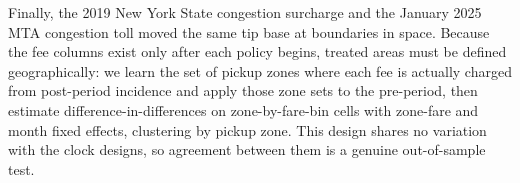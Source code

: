 Finally, the 2019 New York State congestion surcharge and the January
2025 MTA congestion toll moved the same tip base at boundaries in space.
Because the fee columns exist only after each policy begins, treated
areas must be defined geographically: we learn the set of pickup zones
where each fee is actually charged from post-period incidence and apply
those zone sets to the pre-period, then estimate
difference-in-differences on zone-by-fare-bin cells with zone-fare and
month fixed effects, clustering by pickup zone. This design shares no
variation with the clock designs, so agreement between them is a
genuine out-of-sample test.
